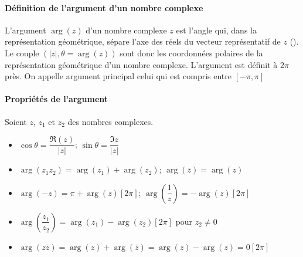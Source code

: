 \paragraph{Définition de l'argument d'un nombre complexe}
L'argument $\arg{(z)}$ d'un nombre complexe $z$ est l'angle qui, dans la 
représentation géométrique, sépare l'axe des réels du vecteur représentatif de 
$z$ (). Le couple $(|z|,\theta=\arg{(z)})$ sont donc 
les coordonnées polaires de la représentation géométrique d'un nombre complexe.
L'argument est définit à $2\pi$ près. On appelle argument principal celui qui 
est compris entre $[-\pi,\pi]$

\newpage
\paragraph{Propriétés de l'argument}
Soient $z$, $z_1$ et $z_2$ des nombres complexes.
\begin{itemize}
    \item $\cos\theta=\dfrac{\Re(z)}{|z|}$; $\sin\theta=\dfrac{\Im{z}}{|z|}$
    \item $\arg(z_1z_2)=\arg(z_1)+\arg(z_2)$; $\arg(\bar{z})=\arg(z)$
    \item $\arg(-z)=\pi+\arg(z)[2\pi]$; 
          $\arg\left(\dfrac{1}{z}\right)=-\arg(z)[2\pi]$
    \item $\arg\left(\dfrac{z_1}{z_2}\right)=\arg(z_1)-\arg(z_2)[2\pi]$ 
          pour $z_2\neq0$
    \item $\arg(z\bar{z})=\arg(z)+\arg(\bar{z})=\arg(z)-\arg(z)=0[2\pi]$
\end{itemize}

